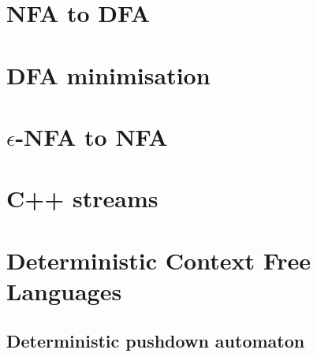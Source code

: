 \documentclass[a4paper,12pt]{article}
\begin{document}
\section{NFA to DFA}

\section{DFA minimisation}

\section{\(\epsilon\)-NFA to NFA}

\section{C++ streams}

\section{Deterministic Context Free Languages}

\subsection{Deterministic pushdown automaton}
\end{document}
